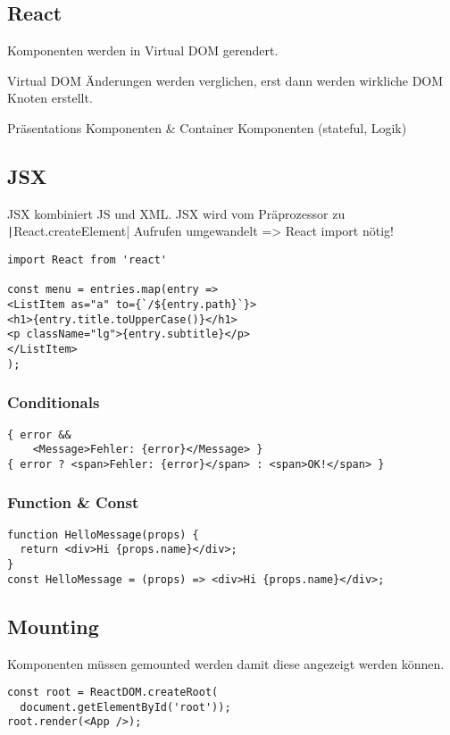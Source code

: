 \begin{multicols*}{2}
\section{React}

Komponenten werden in Virtual DOM gerendert.

Virtual DOM Änderungen werden verglichen, erst dann werden wirkliche DOM Knoten erstellt.

Präsentations Komponenten \& Container Komponenten (stateful, Logik)

\subsection{JSX}
JSX kombiniert JS und XML. JSX wird vom Präprozessor zu \texttt|React.createElement| Aufrufen umgewandelt => React import nötig!
\begin{verbatim}
import React from 'react'

const menu = entries.map(entry =>
<ListItem as="a" to={`/${entry.path}`}>
<h1>{entry.title.toUpperCase()}</h1>
<p className="lg">{entry.subtitle}</p>
</ListItem>
);
\end{verbatim}

\subsubsection{Conditionals}
\begin{verbatim}
{ error &&
    <Message>Fehler: {error}</Message> }
{ error ? <span>Fehler: {error}</span> : <span>OK!</span> }
\end{verbatim}

\subsubsection{Function \& Const}
\begin{verbatim}
function HelloMessage(props) {
  return <div>Hi {props.name}</div>;
}
const HelloMessage = (props) => <div>Hi {props.name}</div>;
\end{verbatim}

\subsection{Mounting}
Komponenten müssen gemounted werden damit diese angezeigt werden können.
\begin{verbatim}
const root = ReactDOM.createRoot(
  document.getElementById('root'));
root.render(<App />);
\end{verbatim}


\end{multicols*}
